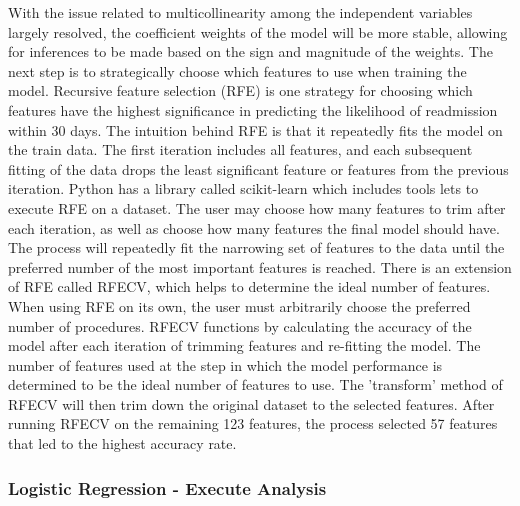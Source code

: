 \documentclass[sigconf]{acmart}
\begin{document}
With the issue related to multicollinearity among the independent variables largely resolved, the coefficient weights of the model will be more stable, allowing for inferences to be made based on the sign and magnitude of the weights. The next step is to strategically choose which features to use when training the model. Recursive feature selection (RFE) is one strategy for choosing which features have the highest significance in predicting the likelihood of readmission within 30 days. The intuition behind RFE is that it repeatedly fits the model on the train data. The first iteration includes all features, and each subsequent fitting of the data drops the least significant feature or features from the previous iteration. Python has a library called scikit-learn which includes tools lets to execute RFE on a dataset. The user may choose how many features to trim after each iteration, as well as choose how many features the final model should have. The process will repeatedly fit the narrowing set of features to the data until the preferred number of the most important features is reached.
There is an extension of RFE called RFECV, which helps to determine the ideal number of features. When using RFE on its own, the user must arbitrarily choose the preferred number of procedures. RFECV functions by calculating the accuracy of the model after each iteration of trimming features and re-fitting the model. The number of features used at the step in which the model performance is determined to be the ideal number of features to use. The 'transform' method of RFECV will then trim down the original dataset to the selected features. After running RFECV on the remaining 123 features, the process selected 57 features that led to the highest accuracy rate. 

\subsubsection{Logistic Regression - Execute Analysis}
\end{document}
